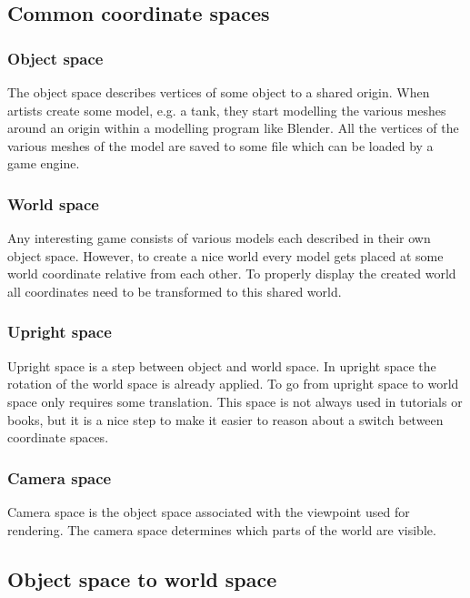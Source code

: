 \documentclass[a4paper,11pt]{article}
\begin{document}
\subsection{Common coordinate spaces}

\subsubsection{Object space}

The object space describes vertices of some object to a shared origin. When artists create some model, e.g. a tank, they start modelling the various meshes around an origin within a modelling program like Blender. All the vertices of the various meshes of the model are saved to some file which can be loaded by a game engine.

\subsubsection{World space}

Any interesting game consists of various models each described in their own object space. However, to create a nice world every model gets placed at some world coordinate relative from each other. To properly display the created world all coordinates need to be transformed to this shared world.

\subsubsection{Upright space}

Upright space is a step between object and world space. In upright space the rotation of the world space is already applied. To go from upright space to world space only requires some translation. This space is not always used in tutorials or books, but it is a nice step to make it easier to reason about a switch between coordinate spaces.

\subsubsection{Camera space}

Camera space is the object space associated with the viewpoint used for rendering. The camera space determines which parts of the world are visible.

\subsection{Object space to world space}
\end{document}
